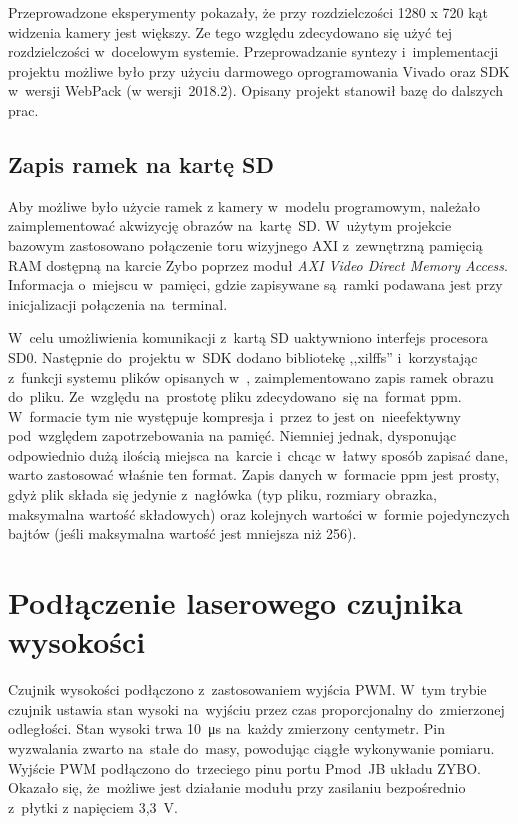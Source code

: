 Przeprowadzone eksperymenty pokazały, że przy rozdzielczości 1280 x 720 kąt widzenia kamery jest większy. 
Ze tego względu zdecydowano się użyć tej rozdzielczości w~docelowym systemie.
Przeprowadzanie syntezy i~implementacji projektu możliwe było przy użyciu darmowego oprogramowania Vivado oraz SDK w~wersji WebPack (w wersji~2018.2). 
Opisany projekt stanowił bazę do dalszych prac.

\subsection{Zapis ramek na kartę SD}
\label{sec:image_sd}
Aby możliwe było użycie ramek z kamery w~modelu programowym, należało zaimplementować akwizycję obrazów na~kartę~SD. 
W~użytym projekcie bazowym zastosowano połączenie toru wizyjnego AXI z~zewnętrzną pamięcią RAM dostępną na karcie Zybo poprzez moduł \textit{AXI Video Direct Memory Access}. 
Informacja o~miejscu w~pamięci, gdzie zapisywane są~ramki podawana jest przy inicjalizacji połączenia na~terminal. %

W~celu umożliwienia komunikacji z~kartą SD uaktywniono interfejs procesora SD0. 
Następnie do~projektu w~SDK dodano bibliotekę ,,xilffs'' i~korzystając z~funkcji systemu plików opisanych w~\cite{xilffs}, zaimplementowano zapis ramek obrazu do~pliku. 
Ze~względu na~prostotę pliku zdecydowano~się na~format ppm. 
W~formacie tym nie występuje kompresja i~przez to jest on~nieefektywny pod~względem zapotrzebowania na pamięć.
Niemniej jednak, dysponując odpowiednio dużą ilością miejsca na~karcie i~chcąc w~łatwy sposób zapisać dane, warto zastosować właśnie ten format. 
Zapis danych w~formacie ppm jest prosty, gdyż plik składa się jedynie z~nagłówka (typ pliku, rozmiary obrazka, maksymalna wartość składowych) oraz kolejnych wartości w~formie pojedynczych bajtów (jeśli maksymalna wartość jest mniejsza niż 256).  



\section{Podłączenie laserowego czujnika wysokości}
\label{subsec:podlaczenie_lasera}

Czujnik wysokości podłączono z~zastosowaniem wyjścia PWM. %
W~tym trybie czujnik ustawia stan wysoki na~wyjściu przez czas proporcjonalny do~zmierzonej odległości. 
Stan wysoki trwa 10~\si{\micro\second} na~każdy zmierzony centymetr. 
Pin wyzwalania zwarto na~stałe do~masy, powodując ciągłe wykonywanie pomiaru. 
Wyjście PWM podłączono do~trzeciego pinu portu Pmod~JB układu ZYBO. %
Okazało się, że~możliwe jest działanie modułu przy zasilaniu bezpośrednio z~płytki z napięciem 3,3~V.

